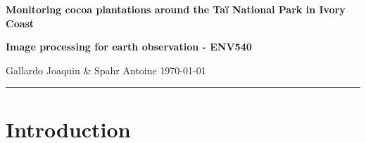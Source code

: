 \documentclass[a4paper, 12pt]{article}
\begin{document}
\begin{center}
    {\Large\textbf{Monitoring cocoa plantations around the Taï National Park in Ivory Coast}}
\end{center}

\begin{center}
    {\textbf{Image processing for earth observation - ENV540}}
\end{center}
Gallardo Joaquin \& Spahr Antoine \hfill {\today}
\vspace{5pt}
\hrule

\setcounter{page}{1}


\section{Introduction} %

\end{document}
